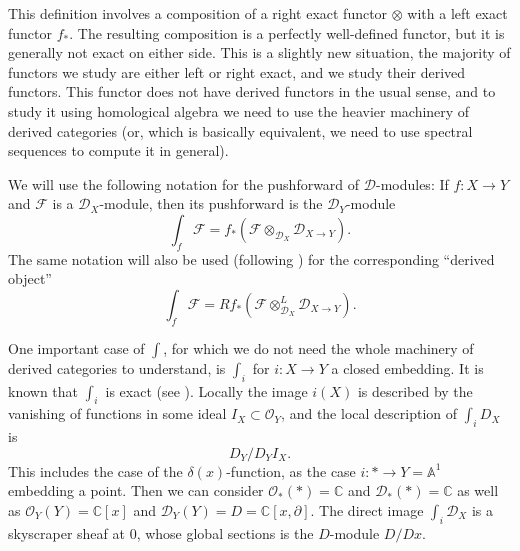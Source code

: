 \documentclass[12pt]{article}
\theoremstyle{plain}
\theoremstyle{definition}
\numberwithin{equation}{section}
\newcommand{\bbA}{\mathbb{A}}
\newcommand{\C}{\mathbb{C}}
\newcommand{\CD}{\mathcal{D}}
\newcommand{\CF}{\mathcal{F}}
\newcommand{\OO}{\mathcal{O}}
\begin{document}
This definition involves a composition of a right exact functor $\otimes$ with a left exact functor $f_*$. The resulting composition is a perfectly well-defined functor, but it is generally not exact on either side. This is a slightly new situation, the majority of functors we study are either left or right exact, and we study their derived functors. This functor does not have derived functors in the usual sense, and to study it using homological algebra we need to use the heavier machinery of derived categories (or, which is basically equivalent, we need to use spectral sequences to compute it in general).


We will use the following notation for the pushforward of $\CD$-modules: If $f : X \rightarrow Y$ and $\CF$ is a $\CD_X$-module, then its pushforward is the $\CD_Y$-module
\[
\int_f \CF = f_* (\CF \otimes_{\CD_X} \CD_{X \rightarrow Y}).
\]
The same notation will also be used (following {\cite[p. 40]{HTT}}) for the corresponding ``derived object''
\[
\int_f \CF = Rf_* (\CF \otimes^L_{\CD_X} \CD_{X \rightarrow Y}).
\]

One important case of $\int$, for which we do not need the whole machinery of derived categories to understand, is $\int_i$ for $i : X \rightarrow Y$ a closed embedding. It is known that $\int_i$ is exact (see {\cite[p. 69]{HTT}}). Locally the image $i(X)$ is described by the vanishing of functions in some ideal $I_X \subset \OO_Y$, and the local description of $\int_i D_X$ is
\[
D_Y / D_Y I_X.
\]
This includes the case of the $\delta(x)$-function, as the case $i : * \rightarrow Y = \bbA^1$ embedding a point. Then we can consider $\OO_*(*) = \C$ and $\CD_*(*) = \C$ as well as $\OO_Y(Y) = \C[x]$ and $\CD_Y(Y) = D = \C[x, \partial]$. The direct image $\int_i \CD_X$ is a skyscraper sheaf at $0$, whose global sections is the $D$-module $D / Dx$.
\end{document}
